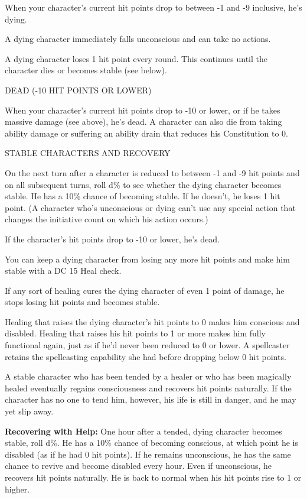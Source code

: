 \documentclass{article}
\begin{document}
When your character's current hit points drop to between -1 and -9 inclusive, he's 
dying.

A dying character immediately falls unconscious and can take no actions.

A dying character loses 1 hit point every round. This continues until the character 
dies or becomes stable (see below).

\vspace{12pt}
DEAD (-10 HIT POINTS OR LOWER)

When your character's current hit points drop to -10 or lower, or if he takes massive 
damage (see above), he's dead. A character can also die from taking ability damage 
or suffering an ability drain that reduces his Constitution to 0.

\vspace{12pt}
STABLE CHARACTERS AND RECOVERY

On the next turn after a character is reduced to between -1 and -9 hit points and 
on all subsequent turns, roll d\% to see whether the dying character becomes stable. 
He has a 10\% chance of becoming stable. If he doesn't, he loses 1 hit point. (A 
character who's unconscious or dying can't use any special action that changes 
the initiative count on which his action occurs.)

If the character's hit points drop to -10 or lower, he's dead.

You can keep a dying character from losing any more hit points and make him stable 
with a DC 15 Heal check.

If any sort of healing cures the dying character of even 1 point of damage, he 
stops losing hit points and becomes stable.

Healing that raises the dying character's hit points to 0 makes him conscious and 
disabled. Healing that raises his hit points to 1 or more makes him fully functional 
again, just as if he'd never been reduced to 0 or lower. A spellcaster retains 
the spellcasting capability she had before dropping below 0 hit points.

A stable character who has been tended by a healer or who has been magically healed 
eventually regains consciousness and recovers hit points naturally. If the character 
has no one to tend him, however, his life is still in danger, and he may yet slip 
away.

\textbf{Recovering with Help:} One hour after a tended, dying character becomes 
stable, roll d\%. He has a 10\% chance of becoming conscious, at which point he 
is disabled (as if he had 0 hit points). If he remains unconscious, he has the 
same chance to revive and become disabled every hour. Even if unconscious, he recovers 
hit points naturally. He is back to normal when his hit points rise to 1 or higher.
\end{document}
